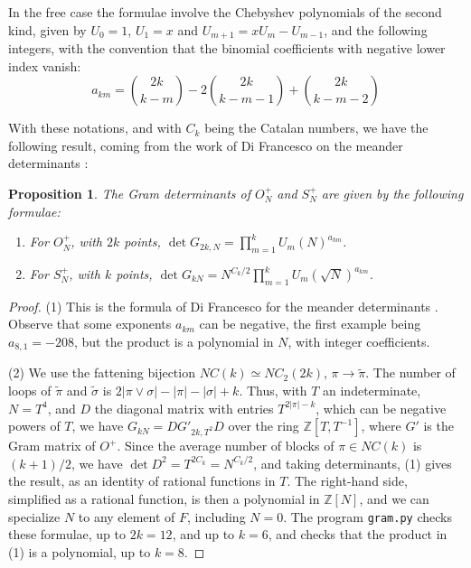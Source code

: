 \documentclass[11pt]{amsart}
\newtheorem{proposition}[theorem]{Proposition}
\theoremstyle{definition}
\begin{document}
In the free case the formulae involve the Chebyshev polynomials of the second kind, given by $U_0=1$, $U_1=x$ and $U_{m+1}=xU_m-U_{m-1}$, and the following integers, with the convention that the binomial coefficients with negative lower index vanish:
$$a_{km}=\binom{2k}{k-m}-2\binom{2k}{k-m-1}+\binom{2k}{k-m-2}$$

With these notations, and with $C_k$ being the Catalan numbers, we have the following result, coming from the work of Di Francesco on the meander determinants \cite{dif}:

\begin{proposition}
\label{p25}
The Gram determinants of $O_N^+$ and $S_N^+$ are given by the following formulae:
\begin{enumerate}
\item For $O_N^+$, with $2k$ points, $\det G_{2k,N}=\prod_{m=1}^kU_m(N)^{a_{km}}$.

\item For $S_N^+$, with $k$ points, $\det G_{kN}=N^{C_k/2}\prod_{m=1}^kU_m(\sqrt N)^{a_{km}}$.
\end{enumerate}
\end{proposition}

\begin{proof}
(1) This is the formula of Di Francesco for the meander determinants \cite{dif}. Observe that some exponents $a_{km}$ can be negative, the first example being $a_{8,1}=-208$, but the product is a polynomial in $N$, with integer coefficients.

(2) We use the fattening bijection $NC(k)\simeq NC_2(2k)$, $\pi\to\tilde\pi$. The number of loops of $\tilde\pi$ and $\tilde\sigma$ is $2|\pi\vee\sigma|-|\pi|-|\sigma|+k$. Thus, with $T$ an indeterminate, $N=T^4$, and $D$ the diagonal matrix with entries $T^{2|\pi|-k}$, which can be negative powers of $T$, we have $G_{kN}=DG'_{2k,T^2}D$ over the ring $\mathbb Z[T,T^{-1}]$, where $G'$ is the Gram matrix of $O^+$. Since the average number of blocks of $\pi\in NC(k)$ is $(k+1)/2$, we have $\det D^2=T^{2C_k}=N^{C_k/2}$, and taking determinants, (1) gives the result, as an identity of rational functions in $T$. The right-hand side, simplified as a rational function, is then a polynomial in $\mathbb Z[N]$, and we can specialize $N$ to any element of $F$, including $N=0$. The program {\tt gram.py} checks these formulae, up to $2k=12$, and up to $k=6$, and checks that the product in (1) is a polynomial, up to $k=8$.
\end{proof}
\end{document}
